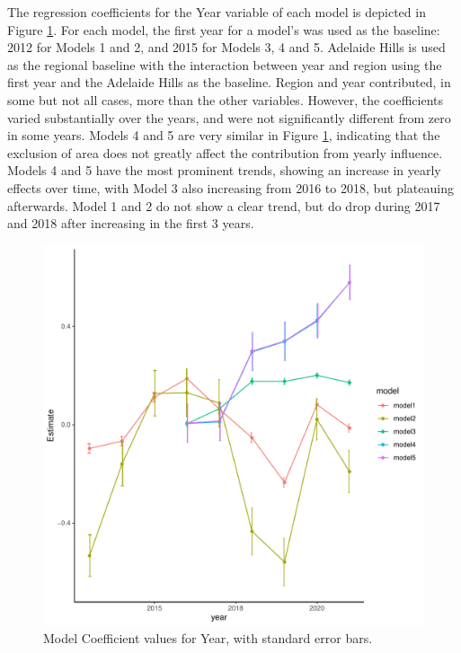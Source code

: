 \documentclass[review,12pt,authoryear]{elsarticle}
\begin{document}
\begin{linenumbers}
\begin{table}[]
{\begin{tabular}{@{}cccccccc@{}}
      \end{tabular}      
  }
\end{table}

The regression coefficients for the Year variable of each model is depicted in Figure \ref{fig:yearly}. For each model, the first year for a model's was used as the baseline: 2012 for Models 1 and 2, and 2015 for Models 3, 4 and 5. Adelaide Hills is used as the regional baseline with the interaction between year and region using the first year and the Adelaide Hills as the baseline. Region and year contributed, in some but not all cases, more than the other variables. However, the coefficients varied substantially over the years, and were not significantly different from zero in some years. Models 4 and 5 are very similar in Figure \ref{fig:yearly}, indicating that the exclusion of area does not greatly affect the contribution from yearly influence. Models 4 and 5 have the most prominent trends, showing an increase in yearly effects over time, with Model 3 also increasing from 2016 to 2018, but plateauing afterwards. Model 1 and 2 do not show a clear trend, but do drop during 2017 and 2018 after increasing in the first 3 years.
\par
\begin{figure}
  \includegraphics{yearly_plots.pdf}
  \caption{Model Coefficient values for Year, with standard error bars.}\label{fig:yearly}
  \end{figure}


\end{linenumbers}
\end{document}
